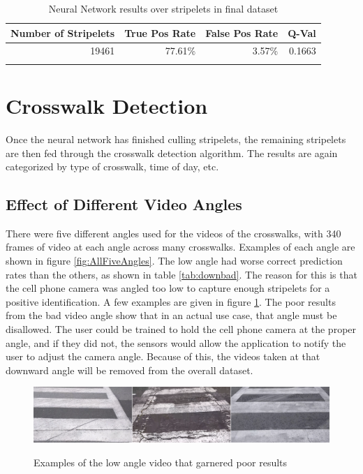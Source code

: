 \documentclass[12pt]{ucthesis}
\newcommand{\captionfonts}{\small\bf\ssp}
\begin{document}
    \begin{table}[t]
        \begin{longtable}{|r|r|r|r|}
        \hline
        Number of Stripelets & True Pos Rate & False Pos Rate & Q-Val \bigstrut\\
        \hline
        19461 & 77.61\% & 3.57\% & 0.1663 \bigstrut\\
        \hline

    
        \caption{Neural Network results over stripelets in final dataset}
        \label{tab:nnresultsoverall} 
        \end{longtable}
    \end{table}

\clearpage





\section{Crosswalk Detection}
Once the neural network has finished culling stripelets, the remaining stripelets are then fed through the crosswalk detection algorithm. The results are again categorized by type of crosswalk, time of day, etc. 

\subsection{Effect of Different Video Angles}

There were five different angles used for the videos of the crosswalks, with 340 frames of video at each angle across many crosswalks. Examples of each angle are shown in figure \ref{fig:AllFiveAngles}. The low angle had worse correct prediction rates than the others, as shown in table \ref{tab:downbad}. The reason for this is that the cell phone camera was angled too low to capture enough stripelets for a positive identification. A few examples are given in figure \ref{fig:downBadPic}. The poor results from the bad video angle show that in an actual use case, that angle must be disallowed. The user could be trained to hold the cell phone camera at the proper angle, and if they did not, the sensors would allow the application to notify the user to adjust the camera angle. Because of this, the videos taken at that downward angle will be removed from the overall dataset. 

\begin{figure}[t]
\begin{center}
\includegraphics[width=15cm]{DownBad.png}
\captionfonts
\caption[Low Angle Video Examples]{Examples of the low angle video that garnered poor results}
\label{fig:downBadPic}
\end{center}
\end{figure}
\end{document}
